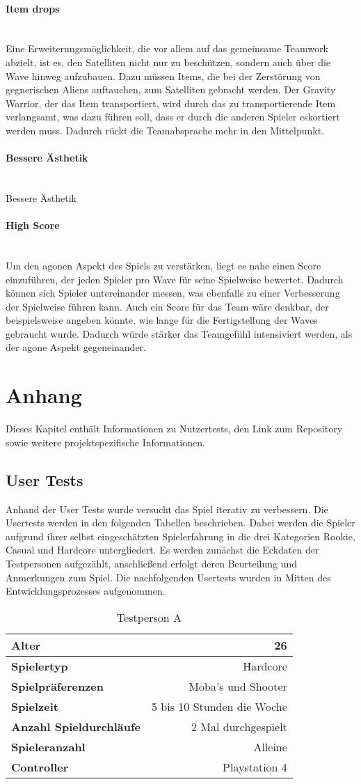 \documentclass[11pt]{scrartcl}
\newcommand{\lbparagraph}[1]{\paragraph*{#1}\mbox{}\\}
\begin{document}
\lbparagraph{Item drops}
Eine Erweiterungsmöglichkeit, die vor allem auf das gemeinsame Teamwork abzielt, ist es,
den Satelliten nicht nur zu beschützen, sondern auch über die Wave hinweg aufzubauen. Dazu
müssen Items, die bei der Zerstörung von gegnerischen Aliens auftauchen, zum Satelliten
gebracht werden. Der Gravity Warrior, der das Item transportiert, wird durch das zu
transportierende Item verlangsamt, was dazu führen soll, dass er durch die anderen Spieler
eskortiert werden muss. Dadurch rückt die Teamabsprache mehr in den Mittelpunkt.

\lbparagraph{Bessere Ästhetik}
Bessere Ästhetik

\lbparagraph{High Score}
Um den agonen Aspekt des Spiels zu verstärken, liegt es nahe einen Score einzuführen, der
jeden Spieler pro Wave für seine Spielweise bewertet. Dadurch können sich Spieler
untereinander messen, was ebenfalls zu einer Verbesserung der Spielweise führen kann.
Auch ein Score für das Team wäre denkbar, der beispielsweise angeben könnte, wie lange für
die Fertigstellung der Waves gebraucht wurde. Dadurch würde stärker das Teamgefühl
intensiviert werden, als der agone Aspekt gegeneinander.


\newpage
\section{Anhang}
\label{sec:appendix}
Dieses Kapitel enthält Informationen zu Nutzertests, den Link zum Repository sowie weitere projektspezifische Informationen.

\subsection{User Tests}
\label{subsec:user-tests}

Anhand der User Tests wurde versucht das Spiel iterativ zu verbessern. Die Usertests werden in den folgenden Tabellen beschrieben. Dabei werden die Spieler aufgrund ihrer selbst eingeschätzten Spielerfahrung in die drei Kategorien Rookie, Casual und Hardcore untergliedert. Es werden zunächst die Eckdaten der Testpersonen aufgezählt, anschließend erfolgt deren Beurteilung und Anmerkungen zum Spiel. Die nachfolgenden Usertests wurden in Mitten des Entwicklungsprozesses aufgenommen. 

\begin{table}[htp]
\centering
\begin{tabular}{|l|r|}
\hline
\textbf{Alter} &26\\
\hline
\textbf{Spielertyp} &Hardcore\\
\hline
\textbf{Spielpräferenzen} &Moba's und Shooter\\
\hline
\textbf{Spielzeit} &5 bis 10 Stunden die Woche\\
\hline
\textbf{Anzahl Spieldurchläufe} &2 Mal durchgespielt\\
\hline
\textbf{Spieleranzahl} &Alleine\\
\hline
\textbf{Controller} &Playstation 4\\
\hline
\end{tabular}
\caption{Testperson A}
\label{tab:test-a}
\end{table}
\end{document}
